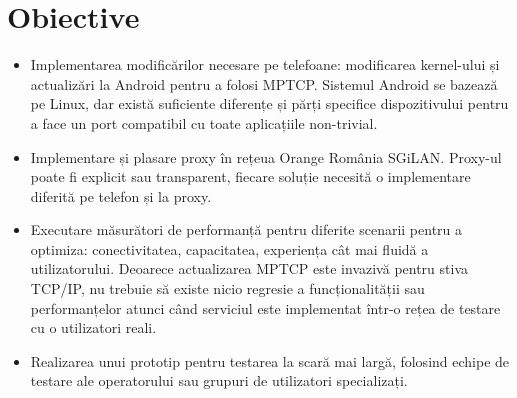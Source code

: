 \chapter{Obiective}
\label{sec:objectives}



\begin{itemize}
\item Implementarea modificărilor necesare pe telefoane: modificarea
kernel-ului și actualizări la Android pentru a folosi
MPTCP. Sistemul Android se bazează pe Linux, dar există suficiente
diferențe și părți specifice dispozitivului pentru a face un port
compatibil cu toate aplicațiile non-trivial.

\item Implementare și plasare proxy în rețeua Orange România
SGiLAN. Proxy-ul poate fi explicit sau transparent, fiecare soluție necesită
o implementare diferită pe telefon și la proxy.


\item Executare măsurători de performanță pentru diferite scenarii
  pentru a optimiza: conectivitatea, capacitatea, experiența cât mai
  fluidă a utilizatorului. Deoarece actualizarea MPTCP este invazivă
  pentru stiva TCP/IP, nu trebuie să existe nicio regresie a
  funcționalității sau performanțelor atunci când serviciul este
  implementat într-o rețea de testare cu o utilizatori reali.


\item Realizarea unui prototip pentru testarea la scară mai largă,
  folosind echipe de testare ale operatorului sau grupuri de
  utilizatori specializați.


\end{itemize}

